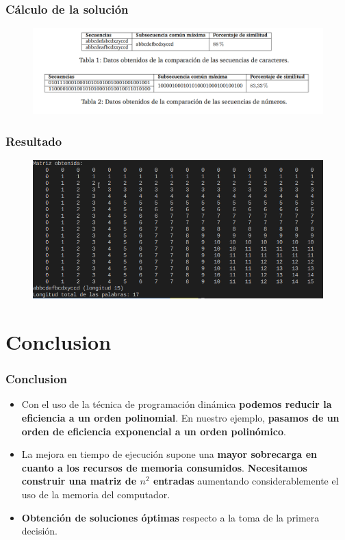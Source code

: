 \documentclass[13pt]{beamer}
\begin{document}
    \begin{frame}
		\frametitle{Cálculo de la solución}
        \begin{figure}
            \centering
            \includegraphics[scale=0.35]{table.png}
          \end{figure}
	\end{frame}


    \begin{frame}
		\frametitle{Resultado}
        \begin{figure}
            \centering
            \includegraphics[scale=0.55]{LettersMatrixResult.png}
          \end{figure}
	\end{frame}


	\section{Conclusion}

    \begin{frame}
		\frametitle{Conclusion}
        \begin{itemize}
            
            \item Con el uso de la técnica de programación dinámica \textbf{podemos reducir la eficiencia a un orden polinomial}. En nuestro ejemplo, \textbf{pasamos de un orden de eficiencia exponencial
            a un orden polinómico}.
            
            \item La mejora en tiempo de ejecución supone una \textbf{mayor sobrecarga en cuanto a los recursos de memoria consumidos}.  \textbf{Necesitamos construir una matriz de $n^{2}$ 
            entradas} aumentando considerablemente el uso de la memoria del computador.

            \item \textbf{Obtención de soluciones óptimas} respecto a la toma de la primera decisión.
            
            
        \end{itemize}
	\end{frame}
\end{document}
